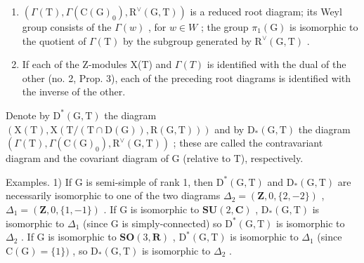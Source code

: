 \begin{enumerate}
\def\labelenumi{\alph{enumi})}
\setcounter{enumi}{1}
\item
  \((\Gamma(\mathrm{T}),\Gamma(\mathrm{C}(\mathrm{G})_{0}),\mathrm{R}^{\vee}(\mathrm{G},\mathrm{T}))\) is a reduced root diagram; its Weyl group consists of the \(\Gamma(w)\) , for \(w\in W\) ; the group \(\pi_{1}(\mathrm{G})\) is isomorphic to the quotient of \(\Gamma(\mathrm{T})\) by the subgroup generated by \(\mathrm{R}^{\vee}(\mathrm{G},\mathrm{T})\) .
\item
  If each of the Z-modules X(T) and \(\Gamma(T)\) is identified with the dual of the other (no. 2, Prop. 3), each of the preceding root diagrams is identified with the inverse of the other.
\end{enumerate}

Denote by \(\mathrm{D}^{*}(\mathrm{G},\mathrm{T})\) the diagram \((\mathrm{X}(\mathrm{T}),\mathrm{X}(\mathrm{T}/(\mathrm{T}\cap\mathrm{D}(\mathrm{G})),\mathrm{R}(\mathrm{G},\mathrm{T})))\) and by \(\mathrm{D}_{*}(\mathrm{G},\mathrm{T})\) the diagram \((\varGamma(\mathrm{T}),\varGamma(\mathrm{C}(\mathrm{G})_{0}),\mathrm{R}^{\vee}(\mathrm{G},\mathrm{T}))\) ; these are called the contravariant diagram and the covariant diagram of G (relative to T), respectively.

Examples. 1) If G is semi-simple of rank 1, then \(\mathrm{D}^{*}(\mathrm{G},\mathrm{T})\) and \(\mathrm{D}_{*}(\mathrm{G},\mathrm{T})\) are necessarily isomorphic to one of the two diagrams \(\Delta_{2}=(\mathbf{Z},0,\{2,-2\})\) , \(\Delta_{1}=(\mathbf{Z},0,\{1,-1\})\) . If G is isomorphic to \(\mathbf{SU}(2,\mathbf{C})\) , \(\mathrm{D}_{*}(\mathrm{G},\mathrm{T})\) is isomorphic to \(\Delta_{1}\) (since G is simply-connected) so \(\mathrm{D}^{*}(\mathrm{G},\mathrm{T})\) is isomorphic to \(\Delta_{2}\) . If G is isomorphic to \(\mathbf{SO}(3,\mathbf{R})\) , \(\mathrm{D}^{*}(\mathrm{G},\mathrm{T})\) is isomorphic to \(\Delta_{1}\) (since \(\mathrm{C}(\mathrm{G})=\{1\})\) , so \(\mathrm{D}_{*}(\mathrm{G},\mathrm{T})\) is isomorphic to \(\Delta_{2}\) .

